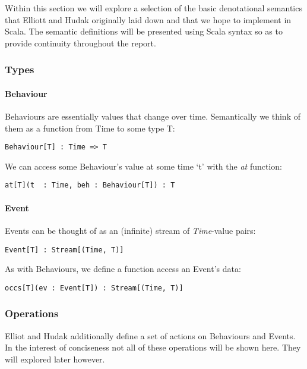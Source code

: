 \documentclass[12pt]{article}
\begin{document}
      Within this section we will explore a selection of the basic denotational semantics that Elliott
      and Hudak originally laid down and that we hope to implement in Scala. The semantic definitions will
      be presented using Scala syntax so as to provide continuity throughout the report.
    
      \subsubsection{Types}
        \paragraph{Behaviour}
          Behaviours are essentially values that change over time. Semantically we think of them as
          a function from Time to some type T:

\begin{verbatim}
Behaviour[T] : Time => T
\end{verbatim}
          
          We can access some Behaviour's value at some time `t' with the \emph{at} function:

\begin{verbatim}
at[T](t  : Time, beh : Behaviour[T]) : T
\end{verbatim}
        
        \paragraph{Event}
          Events can be thought of as an (infinite) stream of \emph{Time}-value pairs:

\begin{verbatim}
Event[T] : Stream[(Time, T)]
\end{verbatim}
          
          As with Behaviours, we define a function access an Event's data:
          
\begin{verbatim}
occs[T](ev : Event[T]) : Stream[(Time, T)]
\end{verbatim}
         
      \subsubsection{Operations}
        Elliot and Hudak additionally define a set of actions on Behaviours and Events. In the interest of
        conciseness not all of these operations will be shown here. They will explored later however.
        
\end{document}
